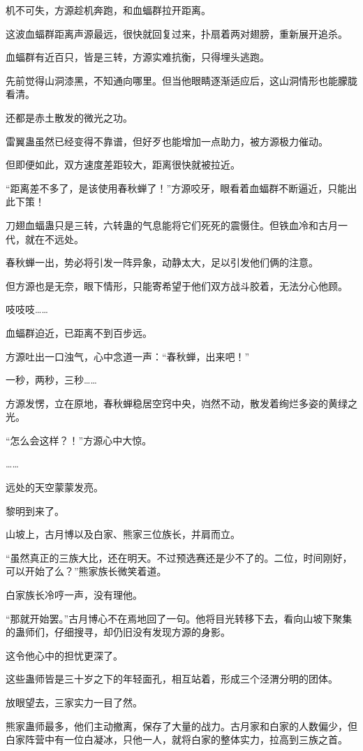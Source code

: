 \begin{this_body}
机不可失，方源趁机奔跑，和血蝠群拉开距离。

这波血蝠群距离声源最远，很快就回复过来，扑扇着两对翅膀，重新展开追杀。

血蝠群有近百只，皆是三转，方源实难抗衡，只得埋头逃跑。

先前觉得山洞漆黑，不知通向哪里。但当他眼睛逐渐适应后，这山洞情形也能朦胧看清。

还都是赤土散发的微光之功。

雷翼蛊虽然已经变得不靠谱，但好歹也能增加一点助力，被方源极力催动。

但即便如此，双方速度差距较大，距离很快就被拉近。

“距离差不多了，是该使用春秋蝉了！”方源咬牙，眼看着血蝠群不断逼近，只能出此下策！

刀翅血蝠蛊只是三转，六转蛊的气息能将它们死死的震慑住。但铁血冷和古月一代，就在不远处。

春秋蝉一出，势必将引发一阵异象，动静太大，足以引发他们俩的注意。

但方源也是无奈，眼下情形，只能寄希望于他们双方战斗胶着，无法分心他顾。

吱吱吱……

血蝠群迫近，已距离不到百步远。

方源吐出一口浊气，心中念道一声：“春秋蝉，出来吧！”

一秒，两秒，三秒……

方源发愣，立在原地，春秋蝉稳居空窍中央，岿然不动，散发着绚烂多姿的黄绿之光。

“怎么会这样？！”方源心中大惊。

……

远处的天空蒙蒙发亮。

黎明到来了。

山坡上，古月博以及白家、熊家三位族长，并肩而立。

“虽然真正的三族大比，还在明天。不过预选赛还是少不了的。二位，时间刚好，可以开始了么？”熊家族长微笑着道。

白家族长冷哼一声，没有理他。

“那就开始罢。”古月博心不在焉地回了一句。他将目光转移下去，看向山坡下聚集的蛊师们，仔细搜寻，却仍旧没有发现方源的身影。

这令他心中的担忧更深了。

这些蛊师皆是三十岁之下的年轻面孔，相互站着，形成三个泾渭分明的团体。

放眼望去，三家实力一目了然。

熊家蛊师最多，他们主动撤离，保存了大量的战力。古月家和白家的人数偏少，但白家阵营中有一位白凝冰，只他一人，就将白家的整体实力，拉高到三族之首。


\end{this_body}
